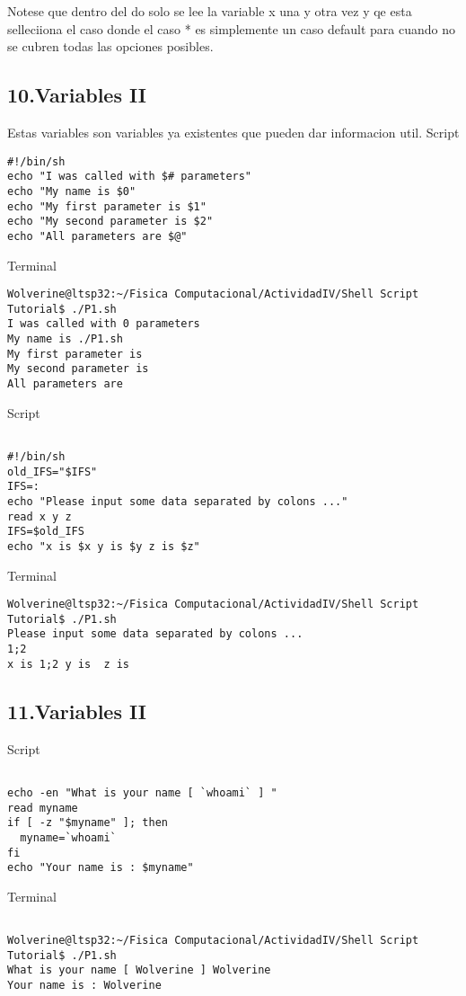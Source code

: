 \documentclass[a4paper]{article}
\begin{document}
Notese que dentro del do solo se lee la variable x una y otra vez y qe esta selleciiona el caso donde el caso * es simplemente un caso default para cuando no se cubren todas las opciones posibles. 

\subsection{10.Variables II}

Estas variables son variables ya existentes que pueden dar informacion util.
\linebreak
Script
\begin{verbatim}
#!/bin/sh
echo "I was called with $# parameters"
echo "My name is $0"
echo "My first parameter is $1"
echo "My second parameter is $2"
echo "All parameters are $@"
\end{verbatim}
Terminal
\begin{verbatim}
Wolverine@ltsp32:~/Fisica Computacional/ActividadIV/Shell Script Tutorial$ ./P1.sh
I was called with 0 parameters
My name is ./P1.sh
My first parameter is 
My second parameter is 
All parameters are 

\end{verbatim}
Script
\begin{verbatim}

#!/bin/sh
old_IFS="$IFS"
IFS=:
echo "Please input some data separated by colons ..."
read x y z
IFS=$old_IFS
echo "x is $x y is $y z is $z"

\end{verbatim}
Terminal
\begin{verbatim}
Wolverine@ltsp32:~/Fisica Computacional/ActividadIV/Shell Script Tutorial$ ./P1.sh
Please input some data separated by colons ...
1;2
x is 1;2 y is  z is 

\end{verbatim}

\subsection{11.Variables II}

Script
\begin{verbatim}

echo -en "What is your name [ `whoami` ] "
read myname
if [ -z "$myname" ]; then
  myname=`whoami`
fi
echo "Your name is : $myname"

\end{verbatim}
Terminal
\begin{verbatim}

Wolverine@ltsp32:~/Fisica Computacional/ActividadIV/Shell Script Tutorial$ ./P1.sh
What is your name [ Wolverine ] Wolverine
Your name is : Wolverine


\end{verbatim}
\end{document}
